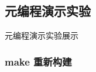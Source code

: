 \documentclass[UTF8]{ctexart}
\begin{document}




































































  \subsection{元编程演示实验}
  {\color{blue}元编程演示实验展示}











\subsubsection{make 重新构建}
\end{document}
